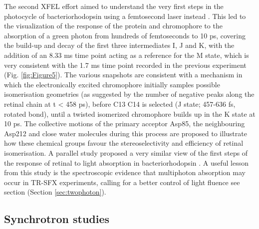 The second XFEL effort aimed to understand the very first steps in the photocycle of bacteriorhodopsin using a femtosecond laser instead \parencite{noglyRetinalIsomerizationBacteriorhodopsin2018}. This led to the visualization of the response of the protein and chromophore to the absorption of a green photon from hundreds of femtoseconds to 10 ps, covering the build-up and decay of the first three intermediates I, J and K, with the addition of an 8.33 ms time point acting as a reference for the M state, which is very consistent with the 1.7 ms time point recorded in the previous experiment (Fig. \ref{fig:Figure5}). The various snapshots are consistent with a mechanism in which the electronically excited chromophore initially samples possible isomerisation geometries (as suggested by the number of negative peaks along the retinal chain at t < 458 ps), before C13 C14 is selected (J state; 457-636 fs, rotated bond), until a twisted isomerized chromophore builds up in the K state at 10 ps. The collective motions of the primary acceptor Asp85, the neighbouring Asp212 and close water molecules during this process are proposed to illustrate how these chemical groups favour the stereoselectivity and efficiency of retinal isomerisation. A parallel study proposed a very similar view of the first steps of the response of retinal to light absorption in bacteriorhodopsin \parencite{nasskovacsThreedimensionalViewUltrafast2019}. A useful lesson from this study is the spectroscopic evidence that multiphoton absorption may occur in TR-SFX experiments, calling for a better control of light fluence see section (Section \ref{sec:twophoton}).

\subsection{Synchrotron studies}

